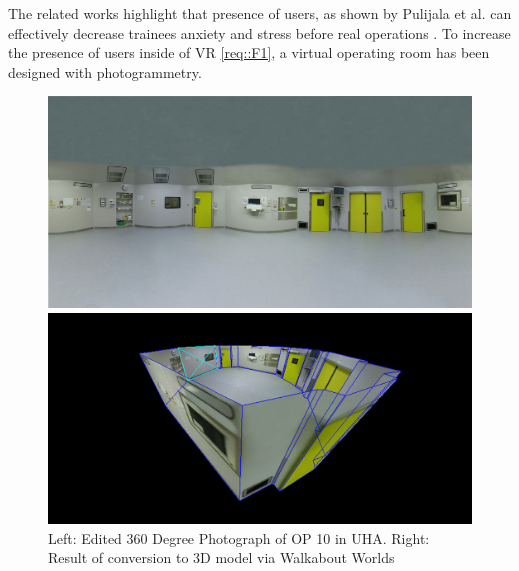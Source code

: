 The related works highlight that presence of users, as shown by Pulijala et al. can effectively decrease trainees anxiety and stress before real operations \cite{Pulijala.2017}.
To increase the presence of users inside of VR \ref{req::F1}, a virtual operating room has been designed with photogrammetry.

\begin{figure}[ht]
    \centering
    \begin{minipage}{.5\textwidth}
      \centering
      \includegraphics[width=0.99\linewidth]{images/implementation/vot/operating_room_360.png}
    \end{minipage}%
    \begin{minipage}{.5\textwidth}
      \centering
      \includegraphics[width=0.99\linewidth]{images/implementation/vot/walkabout_worlds.png}
    \end{minipage}
    \caption{\label{fig::360OperatingRoom}Left: Edited 360 Degree Photograph of OP 10 in UHA. Right: Result of conversion to 3D model via Walkabout Worlds}
\end{figure}

